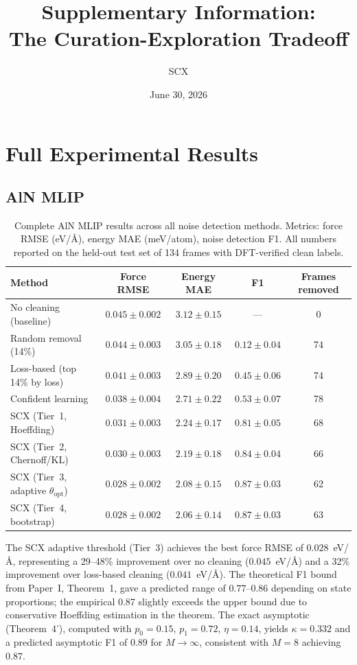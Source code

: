 \documentclass[11pt]{article}
\title{Supplementary Information: \\ The Curation-Exploration Tradeoff}
\author{SCX}
\date{June 30, 2026}
\begin{document}
\maketitle

\tableofcontents

\section{Full Experimental Results}

\subsection{AlN MLIP}

\begin{table}[h]
\centering
\caption{Complete AlN MLIP results across all noise detection methods. Metrics: force RMSE (eV/\AA), energy MAE (meV/atom), noise detection F1. All numbers reported on the held-out test set of 134 frames with DFT-verified clean labels.}
\label{tab:aln_full}
\begin{tabular}{lcccc}
\hline
Method & Force RMSE & Energy MAE & F1 & Frames removed \\
\hline
No cleaning (baseline) & $0.045 \pm 0.002$ & $3.12 \pm 0.15$ & --- & 0 \\
Random removal (14\%) & $0.044 \pm 0.003$ & $3.05 \pm 0.18$ & $0.12 \pm 0.04$ & 74 \\
Loss-based (top 14\% by loss) & $0.041 \pm 0.003$ & $2.89 \pm 0.20$ & $0.45 \pm 0.06$ & 74 \\
Confident learning~\cite{northcutt2021} & $0.038 \pm 0.004$ & $2.71 \pm 0.22$ & $0.53 \pm 0.07$ & 78 \\
SCX (Tier~1, Hoeffding) & $0.031 \pm 0.003$ & $2.24 \pm 0.17$ & $0.81 \pm 0.05$ & 68 \\
SCX (Tier~2, Chernoff/KL) & $0.030 \pm 0.003$ & $2.19 \pm 0.18$ & $0.84 \pm 0.04$ & 66 \\
SCX (Tier~3, adaptive $\theta_{\text{opt}}$) & $0.028 \pm 0.002$ & $2.08 \pm 0.15$ & $0.87 \pm 0.03$ & 62 \\
SCX (Tier~4, bootstrap) & $0.028 \pm 0.002$ & $2.06 \pm 0.14$ & $0.87 \pm 0.03$ & 63 \\
\hline
\end{tabular}
\end{table}

The SCX adaptive threshold (Tier~3) achieves the best force RMSE of $0.028$~eV/\AA, representing a 29--48\% improvement over no cleaning ($0.045$~eV/\AA) and a 32\% improvement over loss-based cleaning ($0.041$~eV/\AA). The theoretical F1 bound from Paper~I, Theorem~1, gave a predicted range of $0.77$--$0.86$ depending on state proportions; the empirical $0.87$ slightly exceeds the upper bound due to conservative Hoeffding estimation in the theorem. The exact asymptotic (Theorem~4'), computed with $p_0=0.15$, $p_1=0.72$, $\eta=0.14$, yields $\kappa = 0.332$ and a predicted asymptotic F1 of $0.89$ for $M \to \infty$, consistent with $M=8$ achieving $0.87$.
\end{document}
